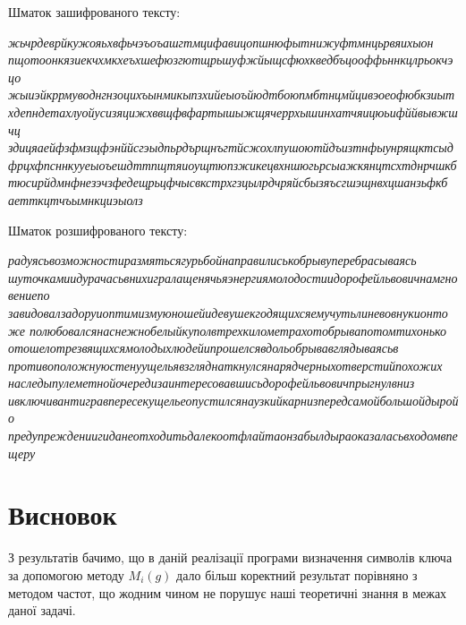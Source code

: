 \documentclass[12pt]{article}
\begin{document}
\noindent
Шматок зашифрованого тексту:
\begin{tcolorbox}[colback=gray!10!white, rounded corners]
    \textit{жьчрдеврйкужояьхвфьчэъоъашгтмцифавицопшнюфытнижуфтмнцьрвяихыон
    пщотоонкязиекчхмкхеъхшефюзгютщрьшуфжйыщсфюхкведбъцооффьннкцлрьокчэцо
    жыиэйкррмуводнгнзоцихъынмикыпзхийеыоъйюдтбоюпмбтнцмйцивэоеофюбкзиыт
    хдепндетахлуойусизяцижхввщфвфартышыжщячеррхышинхатчяицюьифййвывжшчц
    здицяаейфзфмзщфэнййсгэыдпьрдърщнъгтйсжохлпушоютйдъизтнфыунрящктсыд
    фрцхфпсннкууеыоъешдттпщтяиоущтюпзжикецвхншюгьрсыажкянцтсхтднрчшкб
    тюсирйдмнфнезэчзфедещрьцфчысвкстрхгзцылрдчряйсбызяъсгшэщнвхцшанзьфкб
    аетткцтчъымнкциэыолз}
\end{tcolorbox}
\newpage
Шматок розшифрованого тексту: 
\begin{tcolorbox}[colback=gray!10!white, rounded corners]
    \textit{радуясьвозможностиразмятьсягурьбойнаправилиськобрывуперебрасываясь
    шуточкамиидурачасьвнихигралащенячьяэнергиямолодостиидорофейльвовичнамгновениепо
    завидовалзадоруиоптимизмуюношейидевушекгодящихсяемучутьлиневовнукионтоже
    полюбовалсянаснежнобелыйкуполвтрехкилометрахотобрывапотомтихонько
    отошелотрезвящихсямолодыхлюдейипрошелсявдольобрывавглядываясьв
    противоположнуюстенуущельявзгляднаткнулсянарядчерныхотверстийпохожих
    наследыпулеметнойочередизаинтересовавшисьдорофейльвовичпрыгнулвниз
    ивключивантигравпересекущельеопустилсянаузкийкарнизпередсамойбольшойдыройо
    предупреждениигиданеотходитьдалекоотфлайтаонзабылдыраоказаласьвходомвпещеру}
\end{tcolorbox}
    
\section{Висновок}
    
\quad З результатів бачимо, що в даній реалізації програми визначення символів ключа за допомогою методу $M_i(g)$ дало більш коректний результат порівняно з методом частот, що жодним чином не порушує наші теоретичні знання в межах даної задачі. 
\end{document}
